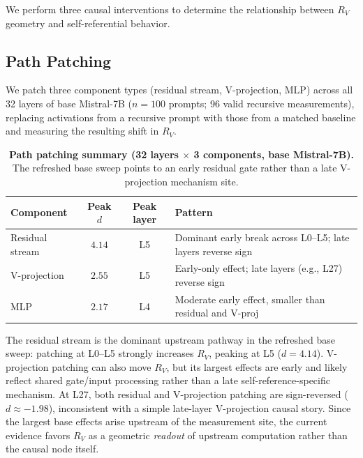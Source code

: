 \documentclass{article}
\newcommand{\RV}{R_V}
\newcommand{\dcohen}{d}
\begin{document}
We perform three causal interventions to determine the relationship between
$\RV$ geometry and self-referential behavior.

\subsection{Path Patching}
\label{sec:pathpatch}

We patch three component types (residual stream, V-projection, MLP) across all
32 layers of base Mistral-7B ($n = 100$ prompts; 96 valid recursive measurements), replacing activations
from a recursive prompt with those from a matched baseline and measuring the resulting shift in $\RV$.

\begin{table}[h]
\centering
\caption{\textbf{Path patching summary (32 layers $\times$ 3 components, base Mistral-7B).}
         The refreshed base sweep points to an early residual gate rather than a late V-projection mechanism site.}
\label{tab:pathpatch}
\smallskip
\begin{tabular}{lccl}
\toprule
\textbf{Component} & \textbf{Peak $\dcohen$} & \textbf{Peak layer} & \textbf{Pattern} \\
\midrule
Residual stream & $4.14$ & L5 & Dominant early break across L0--L5; late layers reverse sign \\
V-projection    & $2.55$ & L5 & Early-only effect; late layers (e.g., L27) reverse sign \\
MLP             & $2.17$ & L4 & Moderate early effect, smaller than residual and V-proj \\
\bottomrule
\end{tabular}
\end{table}

The residual stream is the dominant upstream pathway in the refreshed base sweep:
patching at L0--L5 strongly increases $\RV$, peaking at L5 ($\dcohen = 4.14$).
V-projection patching can also move $\RV$, but its largest effects are early and likely reflect
shared gate/input processing rather than a late self-reference-specific mechanism.
At L27, both residual and V-projection patching are sign-reversed ($\dcohen \approx -1.98$),
inconsistent with a simple late-layer V-projection causal story.
Since the largest base effects arise upstream of the measurement site, the current evidence favors
$\RV$ as a geometric \emph{readout} of upstream computation rather than the causal node itself.
\end{document}
